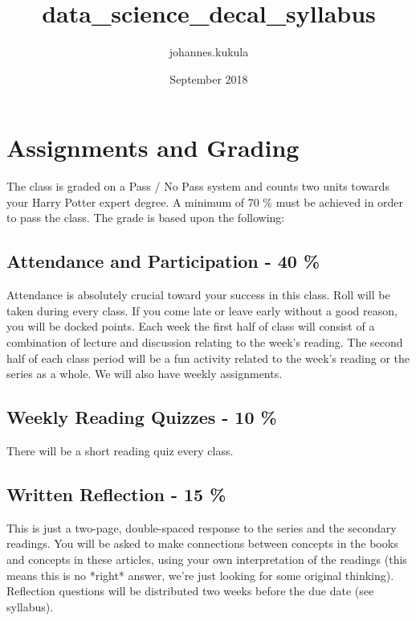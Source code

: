 \documentclass{article}
\title{data_science_decal_syllabus}
\author{johannes.kukula }
\date{September 2018}
\begin{document}
\section*{Assignments and Grading}
	The class is graded on a Pass / No Pass system and counts two units towards your Harry Potter expert degree. A minimum of 70 \% must be achieved in order to pass the class. 
	The grade is based upon the following: 

\subsection*{Attendance and Participation - 40 \%}	
	Attendance is absolutely crucial toward your success in this class. Roll will be taken during every class. If you come late or leave early without a good reason, you will be docked points. Each week the first half of class will consist of a combination of lecture and discussion relating to the week’s reading. The second half of each class period will be a fun activity related to the week’s reading or the series as a whole. We will also have weekly assignments.

\subsection*{Weekly Reading Quizzes - 10 \%}
    There will be a short reading quiz every class.
	
\subsection*{Written Reflection - 15 \%}		
	This is just a two-page, double-spaced response to the series and the secondary readings. You will be asked to make connections between concepts in the books and concepts in these articles, using your own interpretation of the readings (this means this is no *right* answer, we’re just looking for some original thinking). Reflection questions will be distributed two weeks before the due date (see syllabus).
\end{document}
